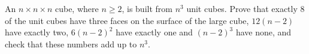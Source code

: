 An $n\times n\times n$ cube, where $n\ge2$, is built from $n^3$ unit cubes. Prove that exactly $8$ of the unit cubes have three faces on the surface of the large cube, $12(n-2)$ have exactly two, $6(n-2)^2$ have exactly one and $(n-2)^3$ have none, and check that these numbers add up to $n^3$.

